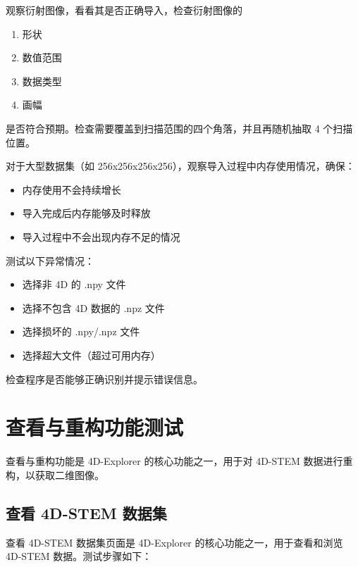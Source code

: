 \documentclass[a4paper,12pt]{report}	%
\begin{document}
观察衍射图像，看看其是否正确导入，检查衍射图像的
\begin{enumerate}
    \item 形状 
    \item 数值范围
    \item 数据类型 
    \item 画幅
\end{enumerate} 
是否符合预期。检查需要覆盖到扫描范围的四个角落，并且再随机抽取 4 个扫描位置。

对于大型数据集（如 256x256x256x256），观察导入过程中内存使用情况，确保：
\begin{itemize}
    \item 内存使用不会持续增长
    \item 导入完成后内存能够及时释放
    \item 导入过程中不会出现内存不足的情况
\end{itemize}

测试以下异常情况：
\begin{itemize}
    \item 选择非 4D 的 .npy 文件
    \item 选择不包含 4D 数据的 .npz 文件
    \item 选择损坏的 .npy/.npz 文件
    \item 选择超大文件（超过可用内存）
\end{itemize}
检查程序是否能够正确识别并提示错误信息。


\chapter{查看与重构功能测试}

查看与重构功能是 4D-Explorer 的核心功能之一，用于对 4D-STEM 数据进行重构，以获取二维图像。

\section{查看 4D-STEM 数据集}

查看 4D-STEM 数据集页面是 4D-Explorer 的核心功能之一，用于查看和浏览 4D-STEM 数据。测试步骤如下：
\end{document}
